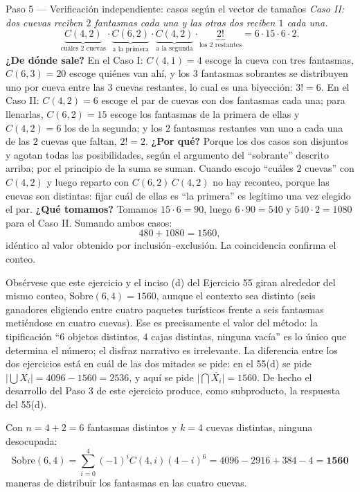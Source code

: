 \documentclass[11pt]{article}
\begin{document}
\begin{sol}
\begin{paso}{Paso 5 --- Verificación independiente: casos según el vector de tamaños}
\medskip
\emph{Caso II: dos cuevas reciben $2$ fantasmas cada una y las otras dos reciben $1$ cada una.}
\[
\underbrace{C(4,2)}_{\text{cuáles 2 cuevas}}\cdot\underbrace{C(6,2)}_{\text{a la primera}}\cdot\underbrace{C(4,2)}_{\text{a la segunda}}\cdot\underbrace{2!}_{\text{los 2 restantes}}
=6\cdot 15\cdot 6\cdot 2 .
\]
\textbf{¿De dónde sale?} En el Caso I: $C(4,1)=4$ escoge la cueva con tres fantasmas, $C(6,3)=20$ escoge quiénes van ahí, y los $3$ fantasmas sobrantes se distribuyen uno por cueva entre las $3$ cuevas restantes, lo cual es una biyección: $3!=6$. En el Caso II: $C(4,2)=6$ escoge el par de cuevas con dos fantasmas cada una; para llenarlas, $C(6,2)=15$ escoge los fantasmas de la primera de ellas y $C(4,2)=6$ los de la segunda; y los $2$ fantasmas restantes van uno a cada una de las $2$ cuevas que faltan, $2!=2$.
\textbf{¿Por qué?} Porque los dos casos son disjuntos y agotan todas las posibilidades, según el argumento del ``sobrante'' descrito arriba; por el principio de la suma se suman. Cuando escojo ``cuáles $2$ cuevas'' con $C(4,2)$ y luego reparto con $C(6,2)\,C(4,2)$ no hay reconteo, porque las cuevas son distintas: fijar cuál de ellas es ``la primera'' es legítimo una vez elegido el par.
\textbf{¿Qué tomamos?} Tomamos $15\cdot 6=90$, luego $6\cdot 90=540$ y $540\cdot 2=1080$ para el Caso II. Sumando ambos casos:
\[
480+1080=1560 ,
\]
idéntico al valor obtenido por inclusión--exclusión. La coincidencia confirma el conteo.
\end{paso}

\begin{nota}
Obsérvese que este ejercicio y el inciso (d) del Ejercicio 55 giran alrededor del mismo conteo, $\text{Sobre}(6,4)=1560$, aunque el contexto sea distinto (seis ganadores eligiendo entre cuatro paquetes turísticos frente a seis fantasmas metiéndose en cuatro cuevas). Ese es precisamente el valor del método: la tipificación ``$6$ objetos distintos, $4$ cajas distintas, ninguna vacía'' es lo único que determina el número; el disfraz narrativo es irrelevante. La diferencia entre los dos ejercicios está en cuál de las dos mitades se pide: en el 55(d) se pide $\bigl|\bigcup X_i\bigr|=4096-1560=2536$, y aquí se pide $\bigl|\bigcap \overline{X_i}\bigr|=1560$. De hecho el desarrollo del Paso 3 de este ejercicio produce, como subproducto, la respuesta del 55(d).
\end{nota}

\end{sol}

\begin{resp}
Con $n=4+2=6$ fantasmas distintos y $k=4$ cuevas distintas, ninguna desocupada:
\[
\text{Sobre}(6,4)=\sum_{i=0}^{4}(-1)^iC(4,i)(4-i)^6=4096-2916+384-4=\mathbf{1560}
\]
maneras de distribuir los fantasmas en las cuatro cuevas.
\end{resp}
\end{document}

